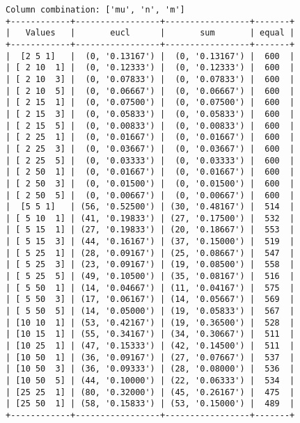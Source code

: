 \documentclass{article}
\begin{document}
\begin{verbatim}
Column combination: ['mu', 'n', 'm']
+------------+-----------------+-----------------+-------+
|   Values   |       eucl      |       sum       | equal |
+------------+-----------------+-----------------+-------+
|  [2 5 1]   |  (0, '0.13167') |  (0, '0.13167') |  600  |
| [ 2 10  1] |  (0, '0.12333') |  (0, '0.12333') |  600  |
| [ 2 10  3] |  (0, '0.07833') |  (0, '0.07833') |  600  |
| [ 2 10  5] |  (0, '0.06667') |  (0, '0.06667') |  600  |
| [ 2 15  1] |  (0, '0.07500') |  (0, '0.07500') |  600  |
| [ 2 15  3] |  (0, '0.05833') |  (0, '0.05833') |  600  |
| [ 2 15  5] |  (0, '0.00833') |  (0, '0.00833') |  600  |
| [ 2 25  1] |  (0, '0.01667') |  (0, '0.01667') |  600  |
| [ 2 25  3] |  (0, '0.03667') |  (0, '0.03667') |  600  |
| [ 2 25  5] |  (0, '0.03333') |  (0, '0.03333') |  600  |
| [ 2 50  1] |  (0, '0.01667') |  (0, '0.01667') |  600  |
| [ 2 50  3] |  (0, '0.01500') |  (0, '0.01500') |  600  |
| [ 2 50  5] |  (0, '0.00667') |  (0, '0.00667') |  600  |
|  [5 5 1]   | (56, '0.52500') | (30, '0.48167') |  514  |
| [ 5 10  1] | (41, '0.19833') | (27, '0.17500') |  532  |
| [ 5 15  1] | (27, '0.19833') | (20, '0.18667') |  553  |
| [ 5 15  3] | (44, '0.16167') | (37, '0.15000') |  519  |
| [ 5 25  1] | (28, '0.09167') | (25, '0.08667') |  547  |
| [ 5 25  3] | (23, '0.09167') | (19, '0.08500') |  558  |
| [ 5 25  5] | (49, '0.10500') | (35, '0.08167') |  516  |
| [ 5 50  1] | (14, '0.04667') | (11, '0.04167') |  575  |
| [ 5 50  3] | (17, '0.06167') | (14, '0.05667') |  569  |
| [ 5 50  5] | (14, '0.05000') | (19, '0.05833') |  567  |
| [10 10  1] | (53, '0.42167') | (19, '0.36500') |  528  |
| [10 15  1] | (55, '0.34167') | (34, '0.30667') |  511  |
| [10 25  1] | (47, '0.15333') | (42, '0.14500') |  511  |
| [10 50  1] | (36, '0.09167') | (27, '0.07667') |  537  |
| [10 50  3] | (36, '0.09333') | (28, '0.08000') |  536  |
| [10 50  5] | (44, '0.10000') | (22, '0.06333') |  534  |
| [25 25  1] | (80, '0.32000') | (45, '0.26167') |  475  |
| [25 50  1] | (58, '0.15833') | (53, '0.15000') |  489  |
+------------+-----------------+-----------------+-------+
\end{verbatim}
\end{document}
